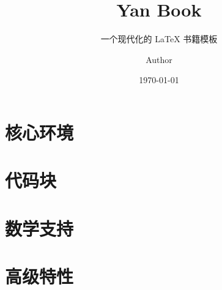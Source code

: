 \documentclass[math]{yanbook}
\title{Yan Book}
\subtitle{一个现代化的 LaTeX 书籍模板}
\author{Author}
\institute{XX University}
\date{\today}
\begin{document}
\makeatletter

\makeatother

\tableofcontents

\chapter{核心环境}


\chapter{代码块}


\chapter{数学支持}


\chapter{高级特性}

\end{document}
